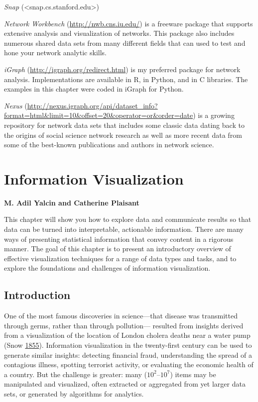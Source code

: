 \documentclass[]{krantz}
\begin{document}
\emph{Snap} (\textless{}snap.cs.stanford.edu\textgreater{})

\emph{Network Workbench} (\url{http://nwb.cns.iu.edu/}) is a freeware
package that supports extensive analysis and visualization of networks.
This package also includes numerous shared data sets from many different
fields that can used to test and hone your network analytic skills.

\emph{iGraph} (\url{http://igraph.org/redirect.html}) is my preferred
package for network analysis. Implementations are available in R, in
Python, and in C libraries. The examples in this chapter were coded in
iGraph for Python.

\emph{Nexus}
(\url{http://nexus.igraph.org/api/dataset_info?format=html\&limit=10\&offset=20\&operator=or\&order=date})
is a growing repository for network data sets that includes some classic
data dating back to the origins of social science network research as
well as more recent data from some of the best-known publications and
authors in network science.

\hypertarget{chap:viz}{\chapter{Information
Visualization}\label{chap:viz}}

\textbf{M. Adil Yalcin and Catherine Plaisant}

This chapter will show you how to explore data and communicate results
so that data can be turned into interpretable, actionable information.
There are many ways of presenting statistical information that convey
content in a rigorous manner. The goal of this chapter is to present an
introductory overview of effective visualization techniques for a range
of data types and tasks, and to explore the foundations and challenges
of information visualization.

\vspace*{-6pt}

\section{Introduction}\label{sec:viz-1}

One of the most famous discoveries in science---that disease was
transmitted through germs, rather than through pollution--- resulted
from insights derived from a visualization of the location of London
cholera deaths near a water pump (Snow
\protect\hyperlink{ref-snow1855mode}{1855}). Information visualization
in the twenty-first century can be used to generate similar insights:
detecting financial fraud, understanding the spread of a contagious
illness, spotting terrorist activity, or evaluating the economic health
of a country. But the challenge is greater: many
(\(10^{2}\)--\(10^{7}\)) items may be manipulated and visualized, often
extracted or aggregated from yet larger data sets, or generated by
algorithms for analytics.
\end{document}
